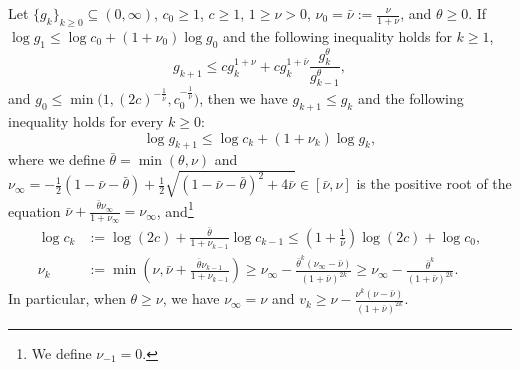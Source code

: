 \begin{lemma}
    \label{lem:appendix/superlinear-rate-boosting-generalized}
    Let $\{ g_k \}_{k \geq 0} \subseteq (0, \infty)$, $c_0\geq 1$, $c \geq 1$, $1\ge \nu>0$, %
    $\nu_0 = \bar \nu := \frac{\nu}{1+\nu}$,
    and $\theta \geq 0$.
    If $\log g_1 \leq \log c_0 + (1 + \nu_0) \log g_0$ and 
    the following inequality holds for $k \geq 1$,
    \begin{equation}
    g_{k+1} \leq c g_k^{1 + \nu} + c g_k^{1 + \bar\nu} \frac{g_k^\theta}{g_{k-1}^\theta},
    \label{eqn:appendix/superlinear-boosting-inequality}
    \end{equation}
    and $g_0 \leq \min\big (1, (2c)^{-\frac{1}{\bar \nu}}, c_0^{-\frac{1}{\bar \nu}} \big )$, 
    then we have $g_{k + 1} \leq g_k$ and the following inequality holds for every $k\geq 0$:
    \begin{equation}
        \label{eqn:appendix/superlinear-rate-boosting}
    \log g_{k+1} \leq \log c_k +  (1 + \nu_k) \log g_k,
    \end{equation}
    where we define $\bar \theta = \min(\theta, \nu)$ and 
    $\nu_\infty = -\frac{1}{2}(1 - \bar\nu-\bar\theta) + \frac{1}{2}\sqrt{(1-\bar\nu-\bar\theta)^2+4\bar \nu} \in [\bar\nu,\nu]$ 
    is  the positive root of the equation $\bar\nu + \frac{\bar\theta\nu_\infty}{1 + \nu_\infty} = \nu_\infty$, and\footnote{We define $\nu_{-1} = 0$.}
    \begin{align}
        \label{eqn:appendix/superlinear-rate-boosting-logc}
        \log c_k &:= \log(2c) + \frac{\bar\theta}{1 + \nu_{k-1}} \log c_{k-1}
        \leq \left(1+\frac{1}{\bar\nu}\right) \log (2c)  + \log c_0
        , \\
        \label{eqn:appendix/superlinear-rate-boosting-nu}
        \nu_k &:= \min\left( \nu, \bar\nu + \frac{\bar \theta \nu_{k-1}}{1 + \nu_{k-1}} \right) 
        \geq \nu_\infty - \frac{\bar\theta^k(\nu_\infty - \bar\nu)}{(1+\bar\nu)^{2k}} 
        \geq \nu_\infty - \frac{\bar\theta^k}{(1+\bar\nu)^{2k}} .
    \end{align}
    In particular, when $\theta\geq\nu$, we have $\nu_\infty = \nu$ and $v_k \geq \nu - \frac{\nu^k(\nu-\bar\nu)}{(1 + \bar\nu)^{2k}}$.
\end{lemma}
